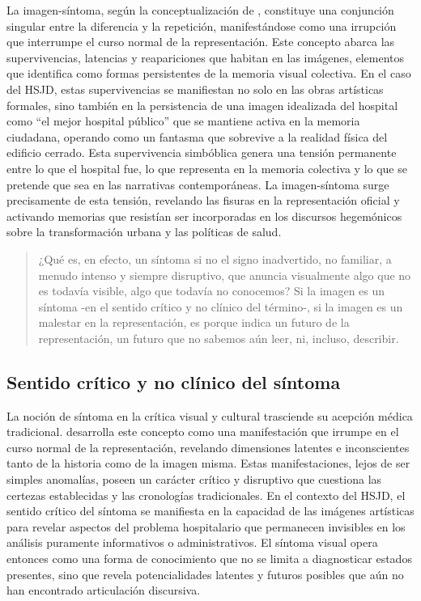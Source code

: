 La imagen-síntoma, según la conceptualización de \parencite{DidiHuberman2011}, constituye una conjunción singular entre la diferencia y la repetición, manifestándose como una irrupción que interrumpe el curso normal de la representación. Este concepto abarca las supervivencias, latencias y reapariciones que habitan en las imágenes, elementos que \parencite{Warburg2010} identifica como formas persistentes de la memoria visual colectiva. En el caso del HSJD, estas supervivencias se manifiestan no solo en las obras artísticas formales, sino también en la persistencia de una imagen idealizada del hospital como ``el mejor hospital público'' que se mantiene activa en la memoria ciudadana, operando como un fantasma que sobrevive a la realidad física del edificio cerrado. Esta supervivencia simbóblica genera una tensión permanente entre lo que el hospital fue, lo que representa en la memoria colectiva y lo que se pretende que sea en las narrativas contemporáneas. La imagen-síntoma surge precisamente de esta tensión, revelando las fisuras en la representación oficial y activando memorias que resistían ser incorporadas en los discursos hegemónicos sobre la transformación urbana y las políticas de salud.

\begin{quote}
¿Qué es, en efecto, un síntoma si no el signo inadvertido, no familiar, a menudo intenso y siempre disruptivo, que anuncia visualmente algo que no es todavía visible, algo que todavía no conocemos? Si la imagen es un síntoma -en el sentido crítico y no clínico del término-, si la imagen es un malestar en la representación, es porque indica un futuro de la representación, un futuro que no sabemos aún leer, ni, incluso, describir. \parencite[p. 307]{DidiHuberman2011}
\end{quote}

\subsection*{Sentido crítico y no clínico del síntoma}

La noción de síntoma en la crítica visual y cultural trasciende su acepción médica tradicional. \parencite{DidiHuberman2011} desarrolla este concepto como una manifestación que irrumpe en el curso normal de la representación, revelando dimensiones latentes e inconscientes tanto de la historia como de la imagen misma. Estas manifestaciones, lejos de ser simples anomalías, poseen un carácter crítico y disruptivo que cuestiona las certezas establecidas y las cronologías tradicionales. En el contexto del HSJD, el sentido crítico del síntoma se manifiesta en la capacidad de las imágenes artísticas para revelar aspectos del problema hospitalario que permanecen invisibles en los análisis puramente informativos o administrativos. El síntoma visual opera entonces como una forma de conocimiento que no se limita a diagnosticar estados presentes, sino que revela potencialidades latentes y futuros posibles que aún no han encontrado articulación discursiva.

